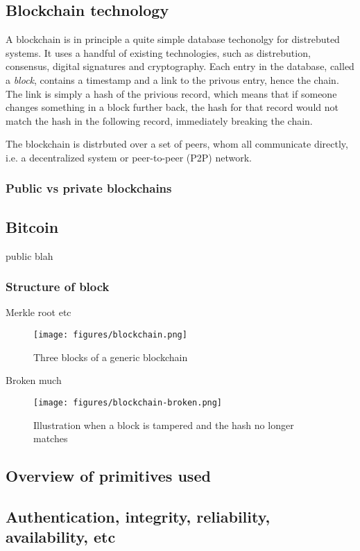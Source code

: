 

\subsection{Blockchain technology}

A blockchain is in principle a quite simple database techonolgy for
distrebuted systems. It uses a handful of existing technologies, such
as distrebution, consensus, digital signatures and cryptography.  Each
entry in the database, called a \textit{block}, contains a timestamp
and a link to the privous entry, hence the chain. The link is simply a
hash of the privious record, which means that if someone changes
something in a block further back, the hash for that record would not
match the hash in the following record, immediately breaking the
chain.

The blockchain is distrbuted over a set of peers, whom all communicate
directly, i.e. a decentralized system or peer-to-peer (P2P) network.


\subsubsection{Public vs private blockchains}

\subsection{Bitcoin}
public blah

\subsubsection{Structure of block}
Merkle root etc

\begin{figure}[ht]
  \centering
  \texttt{[image: figures/blockchain.png]}
  \caption{\label{fig:blockchain} Three blocks of a generic blockchain}
\end{figure}

Broken much

\begin{figure}[ht]
  \centering
  \texttt{[image: figures/blockchain-broken.png]}
  \caption{\label{fig:blockchain-broken} Illustration when a block is
    tampered and the hash no longer matches}
\end{figure}

\subsection{Overview of primitives used}

\subsection{Authentication, integrity, reliability, availability, etc}
